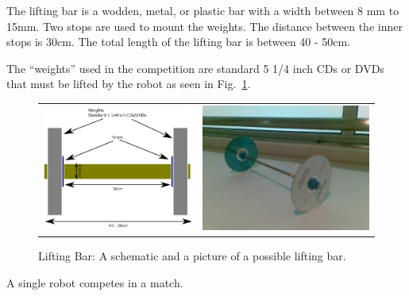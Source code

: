 \documentclass[12pt]{hurocup}
\begin{document}

\begin{lawlist}[WL]

\item The lifting bar is a wodden, metal, or plastic bar with a width
 between 8 mm to 15mm. Two stops are used to mount the weights. The
distance between the inner stops is 30cm. The total length of the
lifting bar is between 40 - 50cm.

\item The ``weights'' used in the competition are standard 5 1/4 inch
 CDs or DVDs that must be lifted by the robot as seen in
 Fig.~\ref{fig:lifting-bar}.

\begin{figure}
\begin{center}
\begin{tabular}{cc}
\includegraphics[width=0.4\linewidth]{Figures/lifting-bar-diagram} 
&
\includegraphics[width=0.4\linewidth]{Figures/lifting-bar1} 
\end{tabular}
\caption{Lifting Bar: A schematic and a picture of a possible lifting
bar.}
\label{fig:lifting-bar}
\end{center}
\end{figure}

\end{lawlist}


\begin{lawlist}[WL]
\item A single robot competes in a match.
\end{lawlist}
\end{document}
